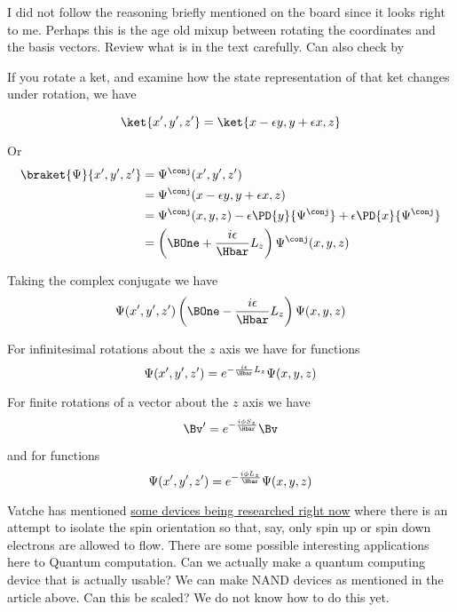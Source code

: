 I did not follow the reasoning briefly mentioned on the board since it looks right to me.  Perhaps this is the age old mixup between rotating the coordinates and the basis vectors.  Review what is in the text carefully.  Can also check by

If you rotate a ket, and examine how the state representation of that ket changes under rotation, we have

\begin{equation}\label{eqn:PHY356FDec7:140}
\ket{x', y', z'} = \ket{x - \epsilon y, y + \epsilon x, z}
\end{equation}

Or
\begin{equation}\label{eqn:lecture12rotationsAndAngularMomentum:320}
\begin{aligned}
\braket{\Psi}{x', y', z'}
&=
\Psi^\conj(x', y', z') \\
&=
\Psi^\conj(x - \epsilon y, y + \epsilon x, z) \\
&=
\Psi^\conj(x , y , z)
- \epsilon \PD{y}{\Psi^\conj}
+ \epsilon \PD{x}{\Psi^\conj} \\
&=
\left( \BOne + \frac{i \epsilon} {\Hbar} L_z \right) \Psi^\conj(x , y , z)
\end{aligned}
\end{equation}

Taking the complex conjugate we have
\begin{equation}\label{eqn:PHY356FDec7:150}
\Psi(x', y', z')
\left( \BOne - \frac{i \epsilon} {\Hbar} L_z \right) \Psi(x , y , z)
\end{equation}

For infinitesimal rotations about the \(z\) axis we have for functions
\begin{equation}\label{eqn:PHY356FDec7:160}
\Psi(x', y', z')
=
e^{ - \frac{i \epsilon} {\Hbar} L_z } \Psi(x , y , z)
\end{equation}

For finite rotations of a vector about the \(z\) axis we have
\begin{equation}\label{eqn:PHY356FDec7:170}
\Bv'
=
e^{ -\frac{i \phi S_z} {\Hbar} } \Bv
\end{equation}

and for functions
\begin{equation}\label{eqn:PHY356FDec7:180}
\Psi(x', y', z')
=
e^{ - \frac{i \phi L_z} {\Hbar} } \Psi(x , y , z)
\end{equation}

Vatche has mentioned \href{https://plato.stanford.edu/entries/qt-quantcomp/#QuanGate}{some devices being researched right now} where there is an attempt to isolate the spin orientation so that, say, only spin up or spin down electrons are allowed to flow.  There are some possible interesting applications here to Quantum computation.  Can we actually make a quantum computing device that is actually usable?  We can make NAND devices as mentioned in the article above.  Can this be scaled?  We do not know how to do this yet.

